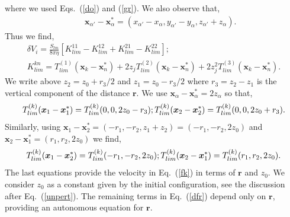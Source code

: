 where we used Eqs.~(\ref{do}) and (\ref{gr}). We also observe that,
\begin{eqnarray}&&\!\!\!\!\!\!\!\!
\bm x_{\alpha'}-\bm x_{\alpha}^*=(x_{\alpha'}-x_{\alpha}, y_{\alpha'}-y_{\alpha}, z_{\alpha'}+z_{\alpha}).
\end{eqnarray}
Thus we find,
\begin{equation} \begin{aligned} %
\delta V_i
=\!\frac{S_{lm}}{8\pi \eta}
\left[K_{lim}^{11}-K_{lim}^{12}+K_{lim}^{21}-K_{lim}^{22}
\right];\\ K_{lim}^{kn}=
T^{(1)}_{lim}(\bm x_k-\bm x_n^*)+2z_jT^{(2)}_{lim}(\bm x_k-\bm x_n^*)+2z_j^2T^{(3)}_{lim}(\bm x_k-\bm x_n^*).
\label{fk}
\end{aligned}
\end{equation}
We write above $z_2=z_0+r_3/2$ and $z_1=z_0-r_3/2$ where $r_3=z_2-z_1$ is the vertical component of the distance $\bm r$.
We use $\bm x_{\alpha}-\bm x_{\alpha}^*=2z_{\alpha}$ so that,
\begin{equation}%
T^{(k)}_{lim}(\bm x_1-\bm x_1^*)=T^{(k)}_{lim}(0, 0, 2z_0-r_3);\\
T^{(k)}_{lim}(\bm x_2-\bm x_2^*)=T^{(k)}_{lim}(0, 0, 2z_0+r_3). \label{tesnor}
\end{equation}
Similarly, using $\bm x_1-\bm x_2^*=(-r_1, -r_2, z_1+z_2)=(-r_1, -r_2, 2z_0)$ and $\bm x_2-\bm x_1^*=(r_1, r_2, 2z_0)$ we find,
\begin{equation}%
T^{(k)}_{lim}(\bm x_1-\bm x_2^*)=T^{(k)}_{lim}(-r_1, -r_2, 2z_0);\\
T^{(k)}_{lim}(\bm x_2-\bm x_1^*)=T^{(k)}_{lim}(r_1, r_2, 2z_0).\label{tesnor1}
\end{equation}
The last equations provide the velocity in Eq.~(\ref{fk}) in terms of $\bm r$ and $z_0$.
We consider $z_0$ as a constant given by the initial configuration, see the discussion
after Eq.~(\ref{unpert}). The remaining terms in Eq.~(\ref{dfr}) depend only on $\bm r$, providing an autonomous equation for $\bm r$.

